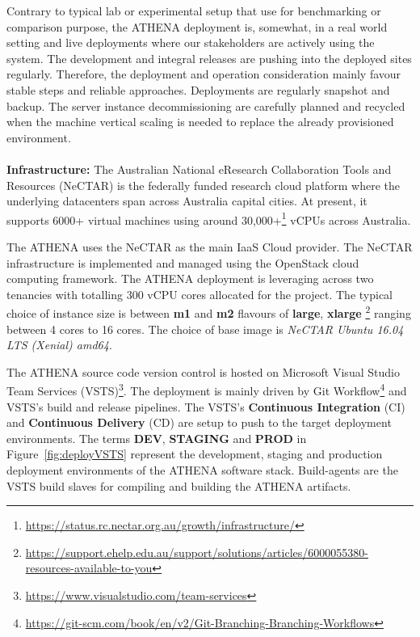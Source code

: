 Contrary to typical lab or experimental setup that use for benchmarking or comparison purpose, the ATHENA deployment is, somewhat, in a real world setting and live deployments where our stakeholders are actively using the system. The development and integral releases are pushing into the deployed sites regularly. Therefore, the deployment and operation consideration mainly favour stable steps and reliable approaches. Deployments are regularly snapshot and backup. The server instance decommissioning are carefully planned and recycled when the machine vertical scaling is needed to replace the already provisioned environment. 
\\
\\
\textbf{Infrastructure:} \quad The Australian National eResearch Collaboration Tools and Resources (NeCTAR) is the federally funded research cloud platform where the underlying datacenters span across Australia capital cities. At present, it supports 6000+ virtual machines using around 30,000+\footnote{\url{https://status.rc.nectar.org.au/growth/infrastructure/}} vCPUs across Australia.

The ATHENA uses the NeCTAR as the main IaaS Cloud provider. The NeCTAR infrastructure is implemented and managed using the OpenStack cloud computing framework. The ATHENA deployment is leveraging across two tenancies with totalling 300 vCPU cores allocated for the project. The typical choice of instance size is between \textbf{m1} and \textbf{m2} flavours of \textbf{large}, \textbf{xlarge} \footnote{\url{https://support.ehelp.edu.au/support/solutions/articles/6000055380-resources-available-to-you}} ranging between 4 cores to 16 cores. The choice of base image is \textit{NeCTAR Ubuntu 16.04 LTS (Xenial) amd64}.

The ATHENA source code version control is hosted on Microsoft Visual Studio Team Services (VSTS)\footnote{\url{https://www.visualstudio.com/team-services}}. The deployment is mainly driven by Git Workflow\footnote{\url{https://git-scm.com/book/en/v2/Git-Branching-Branching-Workflows}} and VSTS's build and release pipelines. The VSTS's \textbf{Continuous Integration} (CI) and \textbf{Continuous Delivery} (CD) \parencite{httermann2012devops} are setup to push to the target deployment environments. The terms \textbf{DEV}, \textbf{STAGING} and \textbf{PROD} in Figure~\ref{fig:deployVSTS} represent the development, staging and production deployment environments of the ATHENA software stack. Build-agents are the VSTS build slaves for compiling and building the ATHENA artifacts.

